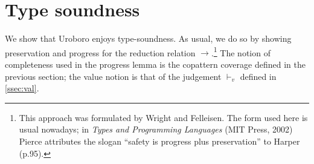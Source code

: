 \section{Type soundness}
\label{sec:urots}

We show that Uroboro enjoys type-soundness. As usual, we do so by showing preservation and progress for the reduction relation $\longrightarrow$.\footnote{This approach was formulated by Wright and Felleisen\cite{wright94syntactic}. The form used here is usual nowadays; in \textit{Types and Programming Languages} (MIT Press, 2002) Pierce attributes the slogan ``safety is progress plus preservation'' to Harper (p.95).} The notion of completeness used in the progress lemma is the copattern coverage defined in the previous section; the value notion is that of the judgement $\vdash_v$ defined in \autoref{ssec:val}.

